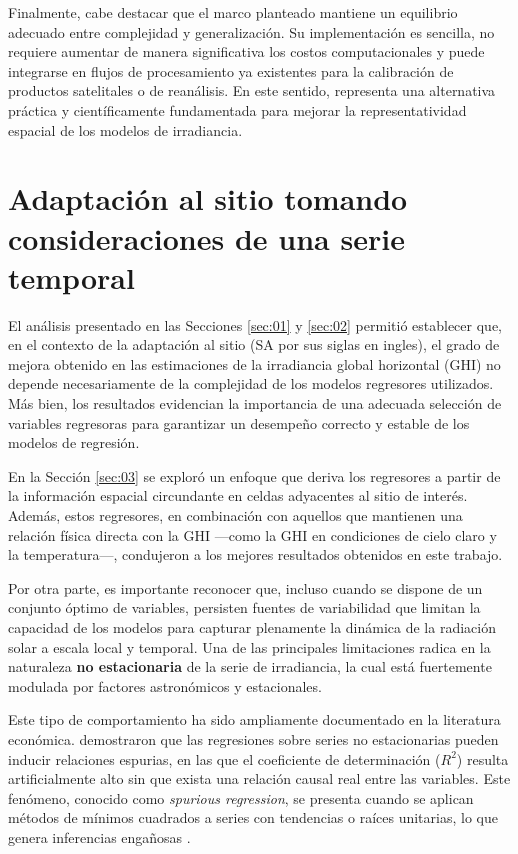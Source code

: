 \documentclass[letterpaper,12pt, twoside]{report}
\providecommand{\DIFdeltex}[1]{{\protect\color{red} \scriptsize #1}} %
\providecommand{\DIFdel}[1]{\texorpdfstring{\DIFdeltex{#1}}{}} %
\begin{document}
\DIFdel{Finalmente, cabe destacar que el marco planteado mantiene un equilibrio adecuado entre complejidad y generalización. Su implementación es sencilla, no requiere aumentar de manera significativa los costos computacionales y puede integrarse en flujos de procesamiento ya existentes para la calibración de productos satelitales o de reanálisis. En este sentido, representa una alternativa práctica y científicamente fundamentada para mejorar la representatividad espacial de los modelos de irradiancia.
}%

\section{\DIFdel{Adaptación al sitio tomando consideraciones de una serie temporal}}%
\addtocounter{section}{-1}%

\DIFdel{El análisis presentado en las Secciones \ref{sec:01} y \ref{sec:02} permitió establecer que, en el contexto de la adaptación al sitio (SA por sus siglas en ingles), el grado de mejora obtenido en las estimaciones de la irradiancia global horizontal (GHI) no depende necesariamente de la complejidad de los modelos regresores utilizados. Más bien, los resultados evidencian la importancia de una adecuada selección de variables regresoras para garantizar un desempeño correcto y estable de los modelos de regresión.
}%

\DIFdel{En la Sección \ref{sec:03} se exploró un enfoque que deriva los regresores a partir de la información espacial circundante en celdas adyacentes al sitio de interés. Además, estos regresores, en combinación con aquellos que mantienen una relación física directa con la GHI —como la GHI en condiciones de cielo claro y la temperatura—, condujeron a los mejores resultados obtenidos en este trabajo.
}%

\DIFdel{Por otra parte, es importante reconocer que, incluso cuando se dispone de un conjunto óptimo de variables, persisten fuentes de variabilidad que limitan la capacidad de los modelos para capturar plenamente la dinámica de la radiación solar a escala local y temporal. Una de las principales limitaciones radica en la naturaleza \textbf{no estacionaria} de la serie de irradiancia, la cual está fuertemente modulada por factores astronómicos y estacionales.
}%

\DIFdel{Este tipo de comportamiento ha sido ampliamente documentado en la literatura económica. \citet{Granger1974} demostraron que las regresiones sobre series no estacionarias pueden inducir relaciones espurias, en las que el coeficiente de determinación ($R^2$) resulta artificialmente alto sin que exista una relación causal real entre las variables. Este fenómeno, conocido como \emph{spurious regression}, se presenta cuando se aplican métodos de mínimos cuadrados a series con tendencias o raíces unitarias, lo que genera inferencias engañosas \citep{Ventosa2009}.
}%
\end{document}
